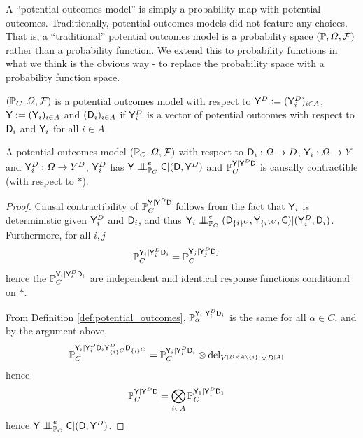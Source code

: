 A ``potential outcomes model'' is simply a probability map with potential outcomes. Traditionally, potential outcomes models did not feature any choices. That is, a ``traditional'' potential outcomes model is a probability space $(\mathbb{P},\Omega,\mathcal{F})$ rather than a probability function. We extend this to probability functions in what we think is the obvious way - to replace the probability space with a probability function space.

\begin{definition}
$(\mathbb{P}_C,\Omega,\mathcal{F})$ is a potential outcomes model with respect to $\mathsf{Y}^D:=(\mathsf{Y}^D_i)_{i\in A}$, $\mathsf{Y}:=(\mathsf{Y}_i)_{i\in A}$ and $(\mathsf{D}_i)_{i\in A}$ if $\mathsf{Y}^D_i$ is a vector of potential outcomes with respect to $\mathsf{D}_i$ and $\mathsf{Y}_i$ for all $i\in A$.
\end{definition}

\begin{theorem}
A potential outcomes model $(\mathbb{P}_C,\Omega,\mathcal{F})$ with respect to $\mathsf{D}_i:\Omega\to D$, $\mathsf{Y}_i:\Omega\to Y$ and $\mathsf{Y}^D_i:\Omega\to Y^D$, $\mathsf{Y}^D_i$ has $\RV{Y}\CI_{\prob{P}_C}^e\RV{C}|(\RV{D},\RV{Y}^D)$ and $\mathbb{P}_C^{\mathsf{Y}|\mathsf{Y}^D\mathsf{D}}$ is causally contractible (with respect to $*$).
\end{theorem}

\begin{proof}
Causal contractibility of $\mathbb{P}_C^{\mathsf{Y}|\mathsf{Y}^D\mathsf{D}}$ follows from the fact that $\mathsf{Y}_i$ is deterministic given $\mathsf{Y}^D_i$ and $\mathsf{D}_i$, and thus $\RV{Y}_i\CI^e_{\prob{P}_C} (\RV{D}_{\{i\}^C},\RV{Y}_{\{i\}^C},\RV{C})|(\RV{Y}^D_{i},\RV{D}_i)$. Furthermore, for all $i,j$
\begin{align}
    \mathbb{P}_C^{\mathsf{Y}_i|\mathsf{Y}^D_i\mathsf{D}_i} &= \mathbb{P}_C^{\mathsf{Y}_j|\mathsf{Y}^D_j\mathsf{D}_j}
\end{align}
hence the $\mathbb{P}_C^{\mathsf{Y}_i|\mathsf{Y}^D_i\mathsf{D}_i}$ are independent and identical response functions conditional on $*$.

From Definition \ref{def:potential_outcomes}, $\mathbb{P}_\alpha^{\mathsf{Y}_i|\mathsf{Y}^D_i\mathsf{D}_i}$ is the same for all $\alpha\in C$, and by the argument above,
\begin{align}
    \mathbb{P}_C^{\mathsf{Y}_i|\mathsf{Y}^D_i\mathsf{D}_i\mathsf{Y}^D_{\{i\}^C}\mathsf{D}_{\{i\}^C}} &= \mathbb{P}_C^{\mathsf{Y}_i|\mathsf{Y}^D_i\mathsf{D}_i}\otimes \mathrm{del}_{Y^{|D\times A\setminus\{i\}|}\times D^{|A|}}
\end{align}
hence
\begin{align}
    \mathbb{P}_C^{\mathsf{Y}|\mathsf{Y}^D\mathsf{D}} &= \bigotimes_{i\in A} \mathbb{P}_C^{\mathsf{Y}_1|\mathsf{Y}^D_1\mathsf{D}_1}
\end{align}
hence $\RV{Y}\CI_{\prob{P}_C}^e\RV{C}|(\RV{D},\RV{Y}^D)$.
\end{proof}

